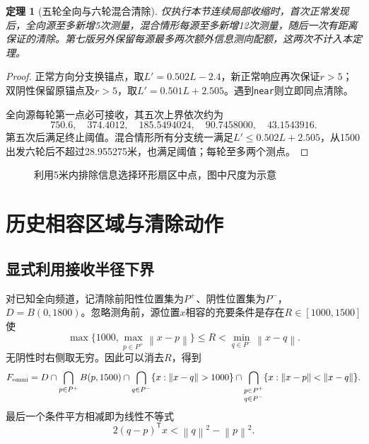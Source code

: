 \documentclass[UTF8,a4paper,zihao=-4,fontset=windows]{ctexart}
\newtheorem{theorem}{定理}[section]
\newcommand{\norm}[1]{\left\lVert#1\right\rVert}
\begin{document}
\begin{theorem}[五轮全向与六轮混合清除]\label{thm:finite}
仅执行本节连续局部收缩时，首次正常发现后，全向源至多新增5次测量，混合情形每源至多新增12次测量，随后一次有距离保证的清除。第七版另外保留每源最多两次额外信息测向配额，这两次不计入本定理。
\end{theorem}
\begin{proof}
正常方向分支换锚点，取$L'=0.502L-2.4$，新正常响应再次保证$r>5$；双阴性保留原锚点及$r>5$，取$L'=0.501L+2.505$。遇到\texttt{near}则立即同点清除。

全向源每轮第一点必可接收，其五次上界依次约为
\begin{equation}
750.6,\quad374.4012,\quad185.5494024,\quad90.7458000,\quad43.1543916.
\end{equation}
第五次后满足终止阈值。混合情形所有分支统一满足$L'\le0.502L+2.505$，从1500出发六轮后不超过28.955275米，也满足阈值；每轮至多两个测点。
\end{proof}

\begin{figure}[htbp]\centering
{}
\caption{利用5米内排除信息选择环形扇区中点，图中尺度为示意}
\end{figure}



\section{历史相容区域与清除动作}
\subsection{显式利用接收半径下界}
对已知全向频道，记清除前阳性位置集为$P^+$、阴性位置集为$P^-$，$D=B(0,1800)$。忽略测角前，源位置$x$相容的充要条件是存在$R\in[1000,1500]$使
\begin{equation}
\max\{1000,\max_{p\in P^+}\norm{x-p}\}\le R
<\min_{q\in P^-}\norm{x-q}.
\end{equation}
无阴性时右侧取无穷。因此可以消去$R$，得到
\begin{equation}\label{eq:exactomni}
F_{\rm omni}=D\cap\bigcap_{p\in P^+}B(p,1500)
\cap\bigcap_{q\in P^-}\{x:\norm{x-q}>1000\}
\cap\bigcap_{\substack{p\in P^+\\q\in P^-}}
\{x:\norm{x-p}<\norm{x-q}\}.
\end{equation}
最后一个条件平方相减即为线性不等式
\begin{equation}
2(q-p)^\mathsf T x<\norm q^2-\norm p^2.
\end{equation}
\end{document}
